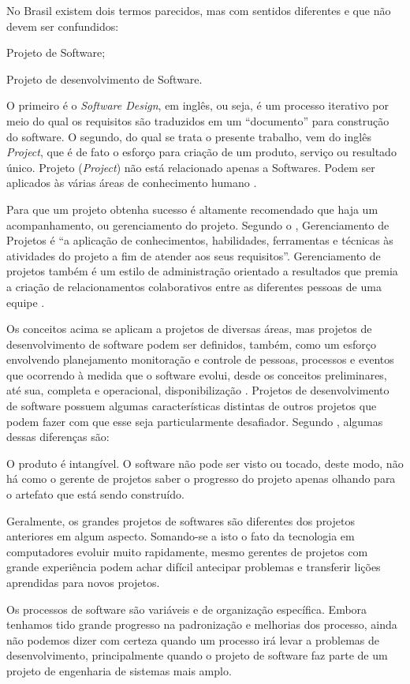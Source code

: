 \documentclass[
    12pt,               %
    openright,          %
    twoside,            %
    a4paper,            %
    chapter=TITLE,     %
    english,            %
    spanish,            %
    portuguese              %
    ]{abntex2}
\newcommand\dblquote[1]{\textquotedblleft #1\textquotedblright}
\begin{document}
No Brasil existem dois termos parecidos, mas com sentidos diferentes e que não devem ser confundidos:

\begin{alineas}
	\item Projeto de Software;
	\item Projeto de desenvolvimento de Software.
\end{alineas}

O primeiro é o \textit{Software Design}, em inglês, ou seja, é um processo iterativo por meio do qual os requisitos são traduzidos em um \dblquote{documento} para construção do software. O segundo, do qual se trata o presente trabalho, vem do inglês \textit{Project}, que é de fato o esforço para criação de um produto, serviço ou resultado único. Projeto (\textit{Project}) não está relacionado apenas a Softwares. Podem ser aplicados às várias áreas de conhecimento humano \cite{pressman2006}.

Para que um projeto obtenha sucesso é altamente recomendado que haja um acompanhamento, ou gerenciamento do projeto. Segundo o , Gerenciamento de Projetos é \dblquote{a aplicação de conhecimentos, habilidades, ferramentas e técnicas às atividades do projeto a fim de atender aos seus requisitos}. Gerenciamento de projetos também é um estilo de administração orientado a resultados que premia a criação de relacionamentos colaborativos entre as diferentes pessoas de uma equipe \cite[p.~3]{grayLarson2009}.

Os conceitos acima se aplicam a projetos de diversas áreas, mas projetos de desenvolvimento de software podem ser definidos, também, como um esforço envolvendo planejamento monitoração e controle de pessoas, processos e eventos que ocorrendo à medida que o software evolui, desde os conceitos preliminares, até sua, completa e operacional, disponibilização \cite{pressman2011}. Projetos de desenvolvimento de software possuem algumas características distintas de outros projetos que podem fazer com que esse seja particularmente desafiador. Segundo , algumas dessas diferenças são:

\begin{alineas}
	\item O produto é intangível. O software não pode ser visto ou tocado, deste modo, não há como o gerente de projetos saber o progresso do projeto apenas olhando para o artefato que está sendo construído.
	\item Geralmente, os grandes projetos de softwares são diferentes dos projetos anteriores em algum aspecto. Somando-se a isto o fato da tecnologia em computadores evoluir muito rapidamente, mesmo gerentes de projetos com grande experiência podem achar difícil antecipar problemas e transferir lições aprendidas para novos projetos.
	\item Os processos de software são variáveis e de organização específica. Embora tenhamos tido grande progresso na padronização e melhorias dos processo, ainda não podemos dizer com certeza quando um processo irá levar a problemas de desenvolvimento, principalmente quando o projeto de software faz parte de um projeto de engenharia de sistemas mais amplo.
\end{alineas}
\end{document}
